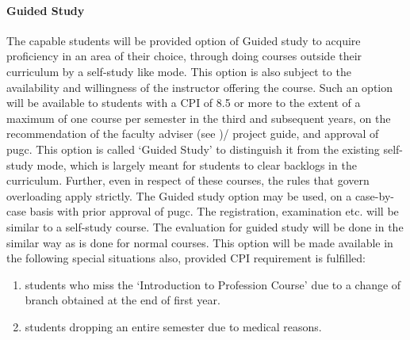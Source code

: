 \paragraph{Guided Study} The capable \glspl{student} will be provided option of Guided study to acquire proficiency in an area of their choice, through doing courses outside their curriculum by a self-study like mode. This option is also subject to the availability and willingness of the instructor offering the course. Such an option will be available to \glspl{student} with a CPI of 8.5 or more to the extent of a maximum of one course per semester in the third and subsequent years, on the recommendation of the faculty adviser (see )/ project guide, and approval of \acrshort{pugc}. This option is called ‘Guided Study' to distinguish it from the existing self-study mode, which is largely meant for \glspl{student} to clear backlogs in the curriculum. Further, even in respect of these courses, the rules that govern overloading apply strictly. The Guided study option may be used, on a case-by-case basis with prior approval of \acrshort{pugc}. The registration, examination etc. will be similar to a self-study course. The evaluation for guided study will be done in the similar way as is done for normal courses. This option will be made available in the following special situations also, provided CPI requirement is fulfilled: 

\begin{enumerate} [leftmargin=15mm]
    \item \Glspl{student} who miss the ‘Introduction to Profession Course' due to a change of branch obtained at the end of first year. 
    \item \Glspl{student} dropping an entire semester due to medical reasons. 
\end{enumerate}